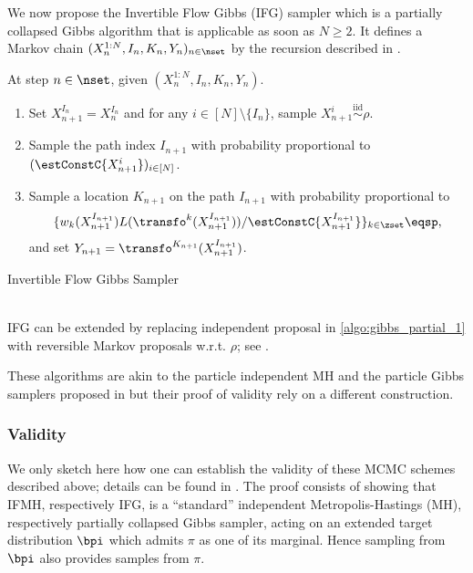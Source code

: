 We now propose the Invertible Flow Gibbs (IFG) sampler which is a partially collapsed Gibbs algorithm \citep{liu:1993,vandyk:park:2008} that is applicable as soon as $N\geq 2$. It defines a Markov chain $(X^{1:N}_n,I_n,K_n,Y_n)_{n \in\nset}$  by the recursion described in . 
\begin{algorithm}
At step
$n \in \nset$, given $(X^{1:N}_n,I_n,K_n,Y_n)$.
\begin{enumerate}[wide, labelwidth=!, labelindent=0pt, label=(\arabic*)]
\item \label{algo:gibbs_partial_1} Set $X^{I_n}_{n+1} = X^{I_n}_{n}$ and for any
  $i \in [N]\setminus \{I_n\}$, sample $X^{i}_{n+1}\overset{\text{iid}}{\sim} \rho$.
\item Sample the path index $I_{n+1}$  with probability proportional to
$(\estConstC{X_{n+1}^{i}})_{i \in [N]}$.
\item Sample a location $K_{n+1}$ on the path  $I_{n+1}$ with probability proportional to $$\{w_k(X^{I_{n+1}}_{n+1})
L(\transfo^k(X^{I_{n+1}}_{n+1}))/ \estConstC{X_{n+1}^{I_{n+1}}}\}_{k\in\zset}\eqsp,$$ and set $Y_{n+1} =\transfo^{K_{n+1}}(X^{I_{n+1}}_{n+1})$. 
\end{enumerate}
\caption{Invertible Flow Gibbs Sampler}
\label{algo:gibbs_partial}
\end{algorithm}
\\IFG can be extended by replacing independent proposal in \ref{algo:gibbs_partial_1} with reversible Markov proposals w.r.t. $\rho$; see . 


These algorithms are akin to the particle independent MH and the particle Gibbs samplers proposed in \cite{andrieu2010particle} but their proof of validity rely on a different construction.

\subsubsection{Validity}
We only sketch here how one can establish  the validity of these MCMC schemes described above; details can be found in . The proof consists of showing that IFMH, respectively IFG, is a ``standard'' independent Metropolis-Hastings (MH), respectively partially collapsed Gibbs sampler, acting on an extended target distribution $\bpi$ which admits $\pi$ as one of its marginal. Hence sampling from $\bpi$ also provides samples from $\pi$.

